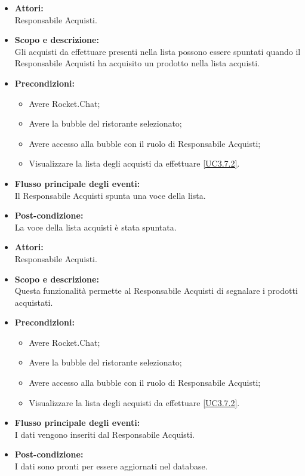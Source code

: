 \begin{itemize}
	\item \textbf{Attori:}
	\\Responsabile Acquisti.
	\item \textbf{Scopo e descrizione:} 
	\\Gli acquisti da effettuare presenti nella lista possono essere spuntati quando il Responsabile Acquisti ha acquisito un prodotto nella lista acquisti.
	\item \textbf{Precondizioni:}
	\begin{itemize}
		\item Avere Rocket.Chat;
		\item Avere la bubble del ristorante selezionato;
		\item Avere accesso alla bubble con il ruolo di Responsabile Acquisti;
		\item Visualizzare la lista degli acquisti da effettuare \ref{UC3.7.2}.
	\end{itemize}
	\item \textbf{Flusso principale degli eventi:}
	\\Il Responsabile Acquisti spunta una voce della lista.
	\item \textbf{Post-condizione:}
	\\La voce della lista acquisti è stata spuntata.
\end{itemize}


\begin{itemize}
	\item \textbf{Attori:}
	\\Responsabile Acquisti.
	\item \textbf{Scopo e descrizione:} 
	\\Questa funzionalità permette al Responsabile Acquisti di segnalare i prodotti acquistati.
	\item \textbf{Precondizioni:}
	\begin{itemize}
		\item Avere Rocket.Chat;
		\item Avere la bubble del ristorante selezionato;
		\item Avere accesso alla bubble con il ruolo di Responsabile Acquisti;
		\item Visualizzare la lista degli acquisti da effettuare \ref{UC3.7.2}.
	\end{itemize}
	\item \textbf{Flusso principale degli eventi:}
	\\I dati vengono inseriti dal Responsabile Acquisti.
	\item \textbf{Post-condizione:}
	\\I dati sono pronti per essere aggiornati nel database.
\end{itemize}

